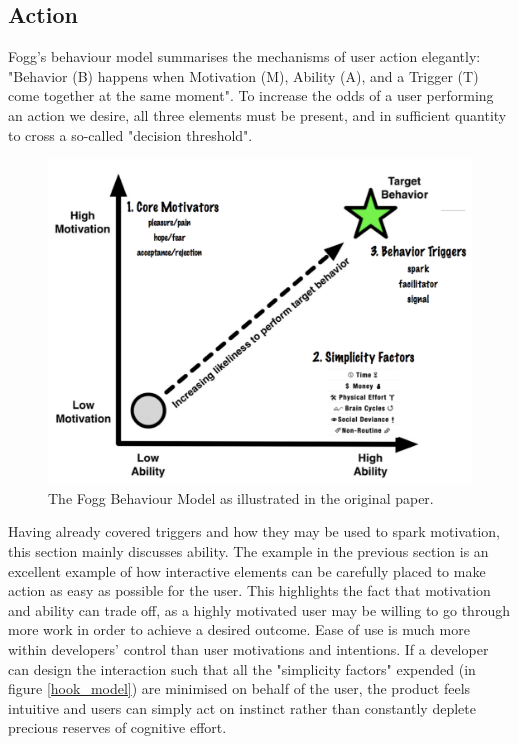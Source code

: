 \subsection{Action}
Fogg's behaviour model \cite{fogg2009behavior} summarises the mechanisms of user action elegantly: "Behavior (B) happens when Motivation (M), Ability (A), and a Trigger (T) come together at the same moment". To increase the odds of a user performing an action we desire, all three elements must be present, and in sufficient quantity to cross a so-called "decision threshold".

\begin{figure}[h]
    \begin{center}
        \includegraphics[scale=0.3]{images/fogg_behaviour.png}
    \end{center}
    \caption{The Fogg Behaviour Model as illustrated in the original paper.}
    \label{fig:fogg_behaviour}
\end{figure}

Having already covered triggers and how they may be used to spark motivation, this section mainly discusses ability. The example in the previous section is an excellent example of how interactive elements can be carefully placed to make action as easy as possible for the user. This highlights the fact that motivation and ability can trade off, as a highly motivated user may be willing to go through more work in order to achieve a desired outcome. Ease of use is much more within developers' control than user motivations and intentions. If a developer can design the interaction such that all the "simplicity factors" expended (in figure \ref{hook_model}) are minimised on behalf of the user, the product feels intuitive and users can simply act on instinct rather than constantly deplete precious reserves of cognitive effort.

